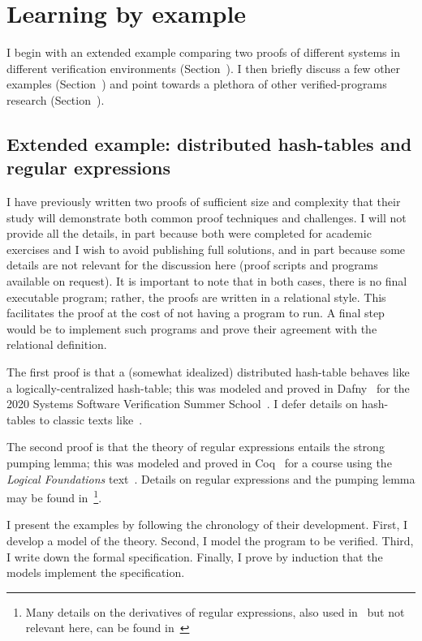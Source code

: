 \section{Learning by example}\label{S:examples}

I begin with an extended example comparing two proofs of different systems in
different verification environments (Section~\label{S:ex_ext}). I then briefly
discuss a few other examples (Section~\label{S:ex_notable}) and point towards a
plethora of other verified-programs research (Section~\label{S:ex_reading}).

\subsection{Extended example: distributed hash-tables and regular
expressions}\label{S:ex_ext}

I have previously written two proofs of sufficient size and complexity that
their study will demonstrate both common proof techniques and challenges. I will
not provide all the details, in part because both were completed for academic
exercises and I wish to avoid publishing full solutions, and in part because
some details are not relevant for the discussion here (proof scripts and
programs available on request). It is important to note that in both cases,
there is no final executable program; rather, the proofs are written in a
relational style. This facilitates the proof at the cost of not having a program
to run. A final step would be to implement such programs and prove their
agreement with the relational definition.

The first proof is that a (somewhat idealized) distributed hash-table behaves
like a logically-centralized hash-table; this was modeled and proved in
Dafny~\cite{leino2010dafny} for the 2020 Systems Software Verification Summer
School~\cite{Kapritsos_2020}. I defer details on hash-tables to classic texts
like~\cite{CLRS}.

The second proof is that the theory of regular expressions entails the strong
pumping lemma; this was modeled and proved in Coq~\cite{Coq} for a course using
the \emph{Logical Foundations} text~\cite{Pierce:SF1}. Details on regular
expressions and the pumping lemma may be found
in~\cite{Lewis_1997,Morrisett_2012}\footnote{Many details on the derivatives of
regular expressions, also used in~\cite{Pierce:SF1,Morrisett_2012} but not
relevant here, can be found in~\cite{Might_Yacc,Might_desugar,Might_deriv}}.

I present the examples by following the chronology of their development. First,
I develop a model of the theory. Second, I model the program to be verified.
Third, I write down the formal specification. Finally, I prove by induction that
the models implement the specification.

